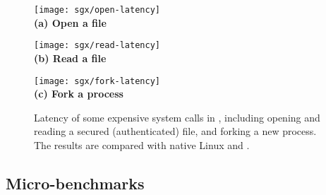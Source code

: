 \begin{figure*}[t!]
\centering

\begin{minipage}{.3\textwidth}
\centering
\texttt{[image: sgx/open-latency]}\\
{\bf (a) Open a file}
\end{minipage}
\begin{minipage}{.3\textwidth}
\centering
\texttt{[image: sgx/read-latency]}\\
{\bf (b) Read a file}
\end{minipage}
\begin{minipage}{.3\textwidth}
\centering
\texttt{[image: sgx/fork-latency]}\\
{\bf (c) Fork a process}
\end{minipage}

\caption{Latency of some expensive system calls in \graphenesgx{}, including opening and reading a secured (authenticated) file, and forking a new process. The results are compared with native Linux and \graphene{}.}
\label{fig:syscall}
\end{figure*}


\subsection{Micro-benchmarks}


